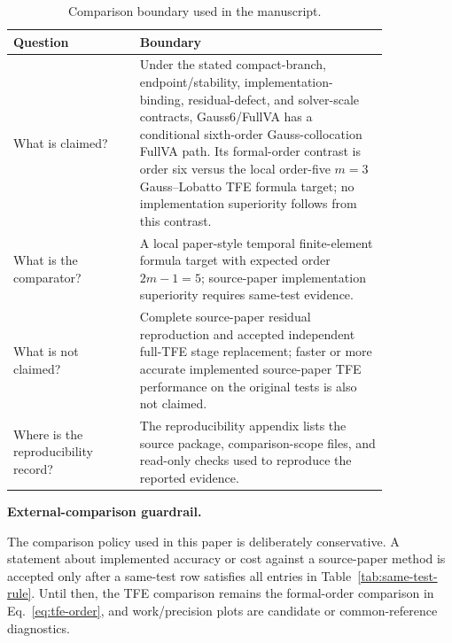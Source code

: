 \documentclass[preprint,12pt]{elsarticle}
\newcommand{\method}{Gauss6\slash FullVA}
\newcommand{\tfe}{TFE}
\begin{document}
\begin{table}[htbp]
\centering
\caption{Comparison boundary used in the manuscript.}
\label{tab:claim-boundary}
\begin{tabular}{P{0.29\linewidth}P{0.55\linewidth}}
\toprule
Question & Boundary \\
\midrule
What is claimed? &
Under the stated compact-branch, endpoint/stability, implementation-binding,
residual-defect, and solver-scale contracts, \method{} has a conditional
sixth-order Gauss-collocation FullVA path. Its
formal-order contrast is order six versus the local order-five $m=3$
Gauss--Lobatto \tfe{} formula target; no implementation superiority follows
from this contrast. \\
What is the comparator? &
A local paper-style temporal finite-element formula target with expected order
$2m-1=5$; source-paper implementation superiority requires same-test evidence. \\
What is not claimed? &
Complete source-paper residual reproduction and accepted independent
full-\tfe{} stage replacement; faster or more accurate implemented
source-paper \tfe{} performance on the original tests is also not claimed. \\
Where is the reproducibility record? &
The reproducibility appendix lists the source package, comparison-scope files,
and read-only checks used to reproduce the reported evidence. \\
\bottomrule
\end{tabular}
\end{table}

\noindent\textbf{External-comparison guardrail.}

The comparison policy used in this paper is deliberately conservative. A
statement about implemented accuracy or cost against a source-paper method is
accepted only after a same-test row satisfies all entries in
Table~\ref{tab:same-test-rule}. Until then, the \tfe{} comparison remains the
formal-order comparison in Eq.~\eqref{eq:tfe-order}, and work/precision plots
are candidate or common-reference diagnostics.
\end{document}
